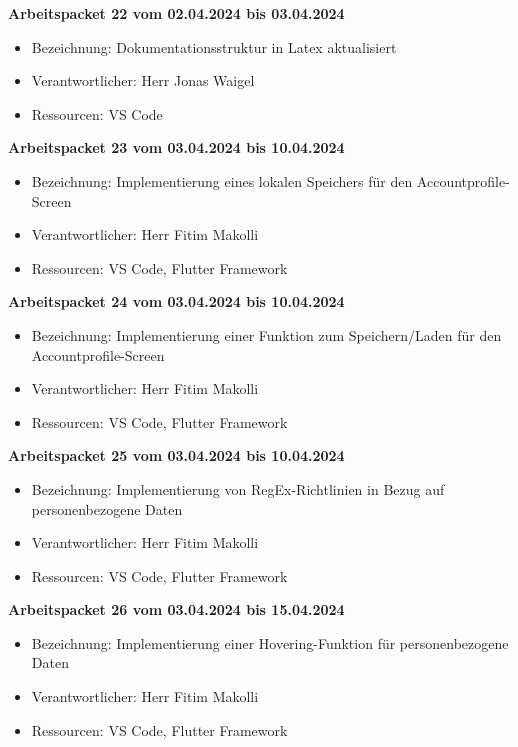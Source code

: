 \textbf{Arbeitspacket 22 vom 02.04.2024 bis 03.04.2024}
\begin{itemize}[itemsep=0pt]
	\item{Bezeichnung: Dokumentationsstruktur in Latex aktualisiert}
	\item{Verantwortlicher: Herr Jonas Waigel} 
	\item{Ressourcen: VS Code} 
\end{itemize} 

\textbf{Arbeitspacket 23 vom 03.04.2024 bis 10.04.2024}
\begin{itemize}[itemsep=0pt]
	\item{Bezeichnung: Implementierung eines lokalen Speichers für den Accountprofile-Screen}
	\item{Verantwortlicher: Herr Fitim Makolli} 
	\item{Ressourcen: VS Code, Flutter Framework} 
\end{itemize}

\textbf{Arbeitspacket 24 vom 03.04.2024 bis 10.04.2024}
\begin{itemize}[itemsep=0pt]
	\item{Bezeichnung: Implementierung einer Funktion zum Speichern/Laden für den Accountprofile-Screen}
	\item{Verantwortlicher: Herr Fitim Makolli} 
	\item{Ressourcen: VS Code, Flutter Framework} 
\end{itemize}

\textbf{Arbeitspacket 25 vom 03.04.2024 bis 10.04.2024}
\begin{itemize}[itemsep=0pt]
	\item{Bezeichnung: Implementierung von RegEx-Richtlinien in Bezug auf personenbezogene Daten}
	\item{Verantwortlicher: Herr Fitim Makolli} 
	\item{Ressourcen: VS Code, Flutter Framework}
\end{itemize} 

\newpage
\textbf{Arbeitspacket 26 vom 03.04.2024 bis 15.04.2024}
\begin{itemize}[itemsep=0pt]
	\item{Bezeichnung: Implementierung einer Hovering-Funktion für personenbezogene Daten}
	\item{Verantwortlicher: Herr Fitim Makolli} 
	\item{Ressourcen: VS Code, Flutter Framework} 
\end{itemize}


